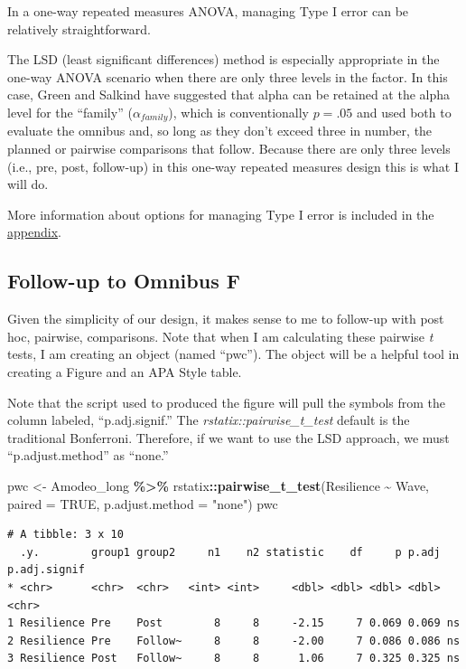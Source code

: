 \documentclass[
  11pt,
]{book}
\newenvironment{Shaded}{\begin{snugshade}}{\end{snugshade}}
\newcommand{\AttributeTok}[1]{\textcolor[rgb]{0.27,0.27,0.27}{#1}}
\newcommand{\ConstantTok}[1]{\textcolor[rgb]{0.37,0.37,0.37}{#1}}
\newcommand{\FunctionTok}[1]{\textcolor[rgb]{0.27,0.27,0.27}{\textbf{#1}}}
\newcommand{\NormalTok}[1]{#1}
\newcommand{\OtherTok}[1]{\textcolor[rgb]{0.37,0.37,0.37}{#1}}
\newcommand{\SpecialCharTok}[1]{\textcolor[rgb]{0.43,0.43,0.43}{\textbf{#1}}}
\newcommand{\StringTok}[1]{\textcolor[rgb]{0.5,0.5,0.5}{#1}}
\begin{document}
In a one-way repeated measures ANOVA, managing Type I error can be relatively straightforward.

The LSD (least significant differences) method is especially appropriate in the one-way ANOVA scenario when there are only three levels in the factor. In this case, Green and Salkind \citeyearpar{green_using_2017} have suggested that alpha can be retained at the alpha level for the ``family'' (\(\alpha_{family}\)), which is conventionally \(p = .05\) and used both to evaluate the omnibus and, so long as they don't exceed three in number, the planned or pairwise comparisons that follow. Because there are only three levels (i.e., pre, post, follow-up) in this one-way repeated measures design this is what I will do.

More information about options for managing Type I error is included in the \protect\hyperlink{type1}{appendix}.

\hypertarget{follow-up-to-omnibus-f}{%
\subsection{Follow-up to Omnibus F}\label{follow-up-to-omnibus-f}}

Given the simplicity of our design, it makes sense to me to follow-up with post hoc, pairwise, comparisons. Note that when I am calculating these pairwise \emph{t} tests, I am creating an object (named ``pwc''). The object will be a helpful tool in creating a Figure and an APA Style table.

Note that the script used to produced the figure will pull the symbols from the column labeled, ``p.adj.signif.'' The \emph{rstatix::pairwise\_t\_test} default is the traditional Bonferroni. Therefore, if we want to use the LSD approach, we must ``p.adjust.method'' as ``none.''

\begin{Shaded}
\begin{Highlighting}[]
\NormalTok{pwc }\OtherTok{\textless{}{-}}\NormalTok{ Amodeo\_long }\SpecialCharTok{\%\textgreater{}\%}
\NormalTok{    rstatix}\SpecialCharTok{::}\FunctionTok{pairwise\_t\_test}\NormalTok{(Resilience }\SpecialCharTok{\textasciitilde{}}\NormalTok{ Wave, }\AttributeTok{paired =} \ConstantTok{TRUE}\NormalTok{, }\AttributeTok{p.adjust.method =} \StringTok{"none"}\NormalTok{)}
\NormalTok{pwc}
\end{Highlighting}
\end{Shaded}

\begin{verbatim}
# A tibble: 3 x 10
  .y.        group1 group2     n1    n2 statistic    df     p p.adj p.adj.signif
* <chr>      <chr>  <chr>   <int> <int>     <dbl> <dbl> <dbl> <dbl> <chr>       
1 Resilience Pre    Post        8     8     -2.15     7 0.069 0.069 ns          
2 Resilience Pre    Follow~     8     8     -2.00     7 0.086 0.086 ns          
3 Resilience Post   Follow~     8     8      1.06     7 0.325 0.325 ns          
\end{verbatim}
\end{document}

